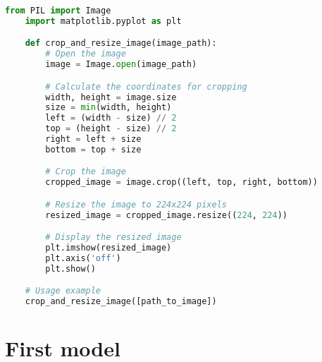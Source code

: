 \begin{lstlisting}[language=Python, caption={Image Cropper}, label={lst:ImageCropper}]
    from PIL import Image
    import matplotlib.pyplot as plt

    def crop_and_resize_image(image_path):
        # Open the image
        image = Image.open(image_path)

        # Calculate the coordinates for cropping
        width, height = image.size
        size = min(width, height)
        left = (width - size) // 2
        top = (height - size) // 2
        right = left + size
        bottom = top + size

        # Crop the image
        cropped_image = image.crop((left, top, right, bottom))

        # Resize the image to 224x224 pixels
        resized_image = cropped_image.resize((224, 224))

        # Display the resized image
        plt.imshow(resized_image)
        plt.axis('off')
        plt.show()

    # Usage example
    crop_and_resize_image([path_to_image])
\end{lstlisting}

\section{First model}


